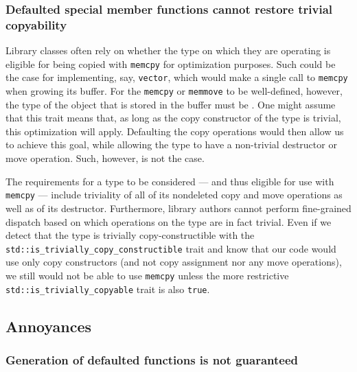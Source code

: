 \subsubsection[Defaulted special member functions cannot restore trivial copyability]{Defaulted special member functions cannot restore trivial copyability}

Library classes often rely on whether the type on which they are operating is eligible for being copied with \lstinline!memcpy! for optimization purposes.  Such could be the case for implementing, say, \lstinline!vector!, which would make a single call to \lstinline!memcpy! when growing its buffer.  For the \lstinline!memcpy! or \lstinline!memmove! to be well-defined, however, the type of the object that is stored in the buffer must be .  One might assume that this trait means that, as long as the copy constructor of the type is trivial, this optimization will apply.  Defaulting the copy operations would then allow us to achieve this goal, while allowing the type to have a non-trivial destructor or move operation.  Such, however, is not the case.  

The requirements for a type to be considered  --- and thus eligible for use with \lstinline!memcpy! --- include triviality of all of its nondeleted copy and move operations as well as of its destructor.  Furthermore, library authors cannot perform fine-grained dispatch based on which operations on the type are in fact trivial.  Even if we detect that the type is trivially copy-constructible with the \lstinline!std::is_trivially_copy_constructible! trait and know that our code would use only copy constructors (and not copy assignment nor any move operations), we still would not be able to use \lstinline!memcpy! unless the more restrictive \lstinline!std::is_trivially_copyable! trait is also \lstinline!true!.

\subsection{Annoyances}

\subsubsection[Generation of defaulted functions is not guaranteed]{Generation of defaulted functions is not guaranteed}\label{generation-of-defaulted-functions-is-not-guaranteed}

